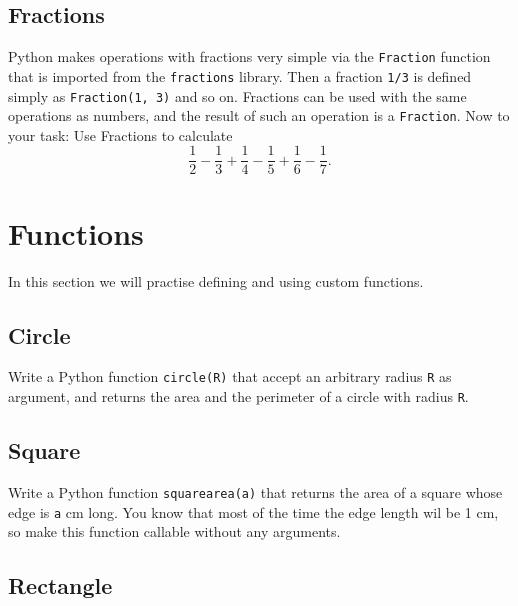 
\subsection{Fractions}

Python makes operations with fractions very simple via the {\tt Fraction}
function that is imported from the {\tt fractions} library. Then 
a fraction {\tt 1/3} is defined simply as {\tt Fraction(1, 3)} and so on. Fractions
can be used with the same operations as numbers, and the result of such 
an operation is a {\tt Fraction}. Now to your task: Use Fractions to 
calculate
$$
\frac{1}{2} - \frac{1}{3} + \frac{1}{4} - \frac{1}{5} + \frac{1}{6} - \frac{1}{7}.
$$


\section{Functions}

In this section we will practise defining and using custom functions.

\subsection{Circle}

Write a Python function {\tt circle(R)} that accept an arbitrary radius {\tt R}
as argument, and returns the area and the perimeter of a circle with radius {\tt R}.


\subsection{Square}

Write a Python function {\tt squarearea(a)} that returns the area of a square whose 
edge is {\tt a} cm long. You know that most of the time the edge length wil be 1 cm,
so make this function callable without any arguments.


\subsection{Rectangle}

